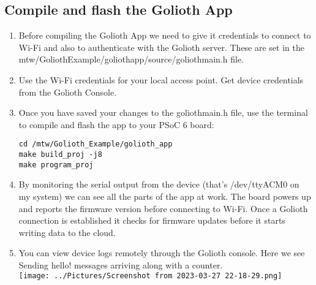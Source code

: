 \documentclass[journal,5pt,twocolumn]{IEEEtran}
\begin{document}
  \subsection{\textbf{Compile and flash the Golioth App}}
 \begin{enumerate}
\item Before compiling the Golioth App we need to give it credentials to connect to Wi-Fi and also to authenticate with the Golioth server. These are set in the mtw/GoliothExample/goliothapp/source/goliothmain.h file.
\item Use the Wi-Fi credentials for your local access point. Get device credentials from the Golioth Console. 
\item Once you have saved your changes to the goliothmain.h file, use the terminal to compile and flash the app to your PSoC 6 board:
 \begin{lstlisting}
cd /mtw/Golioth_Example/golioth_app
make build_proj -j8
make program_proj
 \end{lstlisting}
\item  By monitoring the serial output from the device (that's /dev/ttyACM0 on my system) we can see all the parts of the app at work. The board powers up and reports the firmware version before connecting to Wi-Fi. Once a Golioth connection is established it checks for firmware updates before it starts writing data to the cloud.
\item  You can view device logs remotely through the Golioth console. Here we see Sending hello! messages arriving along with a counter.\\
\vspace{10mm}
\texttt{[image: ../Pictures/Screenshot from 2023-03-27 22-18-29.png]} 
 \end{enumerate}
\end{document}
